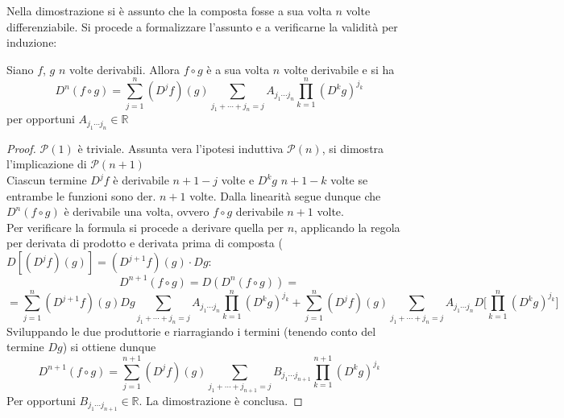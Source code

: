 \documentclass[10pt]{article}
\theoremstyle{plain}
\begin{document}
Nella dimostrazione si è assunto che la composta fosse a sua volta $n$ volte differenziabile. Si procede a formalizzare l'assunto e a verificarne la validità per induzione:
\begin{prop}
    Siano $f$, $g$ $n$ volte derivabili. Allora $f \circ g$ è a sua volta $n$ volte derivabile e si ha
    \[D^n(f\circ g) = \sum \limits_{j=1}^{n}(D^jf)(g)\sum \limits_{j_1 + \cdots + j_n = j} A_{j_1 \cdots j_n} \prod\limits_{k=1}^n(D^kg)^{j_k}\]
    per opportuni $A_{j_1 \cdots j_n} \in \mathbb{R}$
\end{prop}
\begin{proof}
    $\mathcal{P}(1)$ è triviale. Assunta vera l'ipotesi induttiva $\mathcal{P}(n)$, si dimostra l'implicazione di $\mathcal{P}(n+1)$
    \\Ciascun termine $D^jf$ è derivabile $n+1-j$ volte e $D^kg$ $n+1-k$ volte se entrambe le funzioni sono der. $n+1$ volte. Dalla linearità segue dunque che $D^n(f \circ g)$ è derivabile una volta, ovvero $f\circ g$ derivabile $n+1$ volte.
    \\Per verificare la formula si procede a derivare quella per $n$, applicando la regola per derivata di prodotto e derivata prima di composta ($D[(D^jf)(g)] = (D^{j+1}f)(g)\cdot Dg$:
    \[D^{n+1}(f \circ g) = D(D^n(f \circ g)) = \]
    \[= \sum \limits_{j=1}^{n}(D^{j+1}f)(g)Dg\sum \limits_{j_1 + \cdots + j_n = j} A_{j_1 \cdots j_n} \prod\limits_{k=1}^n(D^kg)^{j_k} + \sum \limits_{j=1}^{n}(D^jf)(g)\sum \limits_{j_1 + \cdots + j_n = j} A_{j_1 \cdots j_n} D\bigg[\prod\limits_{k=1}^n(D^kg)^{j_k}\bigg]\]
    Sviluppando le due produttorie e riarragiando i termini (tenendo conto del termine $Dg$) si ottiene dunque
    \[D^{n+1}(f \circ g) = \sum \limits_{j=1}^{n+1}(D^jf)(g)\sum \limits_{j_1 + \cdots + j_{n+1} = j} B_{j_1 \cdots j_{n+1}} \prod\limits_{k=1}^{n+1}(D^kg)^{j_k}\]
    Per opportuni $B_{j_1 \cdots j_{n+1}} \in \mathbb{R}$. La dimostrazione è conclusa.
\end{proof}
\end{document}
